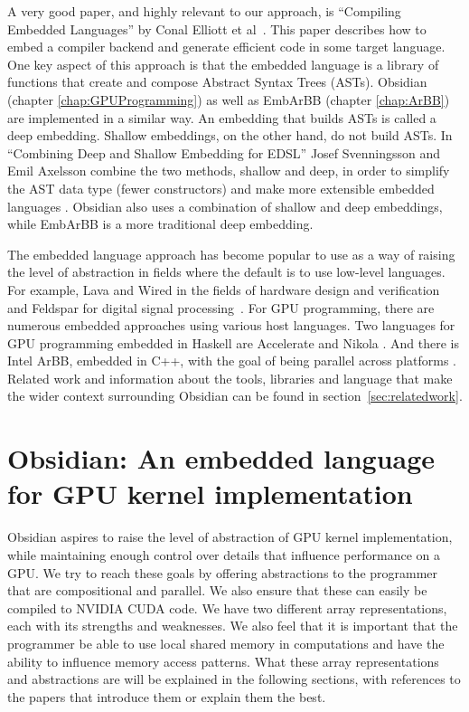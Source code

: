 \documentclass[a4paper]{book}
\begin{document}
A very good paper, and highly relevant to our approach, is ``Compiling Embedded Languages''
by Conal Elliott et al~\citet{COMPILEEDSL}. This paper describes how to embed a compiler 
backend and generate efficient code in some target language. One key aspect of this 
approach is that the embedded language is a library of functions that create and 
compose Abstract Syntax Trees (ASTs). Obsidian (chapter \ref{chap:GPUProgramming}) as 
well as EmbArBB (chapter \ref{chap:ArBB}) are implemented in a similar way. An 
embedding that builds ASTs is called a deep embedding. Shallow embeddings, on the 
other hand, do not build ASTs. In ``Combining Deep and Shallow Embedding for EDSL'' 
Josef Svenningsson and Emil Axelsson combine the two methods, shallow and deep, 
in order to simplify the AST data type (fewer constructors) and make more extensible 
embedded languages \citet{DEEPSHALLOW}. Obsidian also uses a combination of shallow 
and deep embeddings, while EmbArBB is a more traditional deep embedding. 

The embedded language approach has become popular to use as a way of raising the 
level of abstraction in fields where the default is to use low-level languages. 
For example, Lava and Wired in the fields of hardware design and 
verification and Feldspar for digital signal processing~\citet{LAVA,Wired,FELDSPAR2010}. For GPU 
programming, there are numerous embedded approaches using various host languages. 
Two languages for GPU programming embedded in Haskell are  Accelerate and Nikola 
\citet{ACCELERATEDAMP11, NIKOLA}. And there is Intel ArBB, embedded in C++, with the 
goal of being parallel across platforms \citet{ARBB2011}.
Related work and information about the tools, libraries and language that make the 
wider context surrounding Obsidian can be found in section~\ref{sec:relatedwork}. 

%
%
\section{Obsidian: An embedded language for GPU kernel implementation}

Obsidian aspires to raise the level of abstraction of GPU kernel implementation, 
while maintaining enough control over details that influence performance on a GPU. 
We try to reach these goals by offering abstractions to the programmer that are 
compositional and parallel. We also ensure that these can easily be compiled 
to NVIDIA CUDA code. We have two different array representations, each with 
its strengths and weaknesses. We also feel that it is important that the programmer 
be able to use local shared memory in computations and have the ability to influence 
memory access patterns. What these array representations and abstractions are 
will be explained in the following sections, with references to the papers 
that introduce them or explain them the best. 
\end{document}
